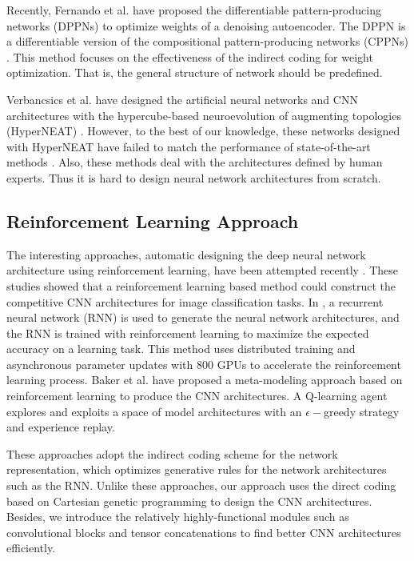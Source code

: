 Recently, Fernando et al. \cite{fernando_convolution_2016} have proposed the differentiable pattern-producing networks (DPPNs) to optimize weights of a denoising autoencoder. The DPPN is a differentiable version of the compositional pattern-producing networks (CPPNs) \cite{stanley_compositional_2007}. This method focuses on the effectiveness of the indirect coding for weight optimization. That is, the general structure of network should be predefined.

Verbancsics et al. \cite{verbancsics_generative_2013,verbancsics_image_2015} have designed the artificial neural networks and CNN architectures with the hypercube-based neuroevolution of augmenting topologies (HyperNEAT) \cite{stanley_hypercube-based_2009}.
However, to the best of our knowledge, these networks designed with HyperNEAT have failed to match the performance of state-of-the-art methods .
Also, these methods deal with the architectures defined by human experts. Thus it is hard to design neural network architectures from scratch.

\subsection{Reinforcement Learning Approach}
The interesting approaches, automatic designing the deep neural network architecture using reinforcement learning, have been attempted recently \cite{zoph_neural_2016,baker_designing_2016}.
These studies showed that a reinforcement learning based method could construct the competitive CNN architectures for image classification tasks.
In \cite{zoph_neural_2016}, a recurrent neural network (RNN) is used to generate the neural network architectures, and the RNN is trained with reinforcement learning to maximize the expected accuracy on a learning task.
This method uses distributed training and asynchronous parameter updates with $800$ GPUs to accelerate the reinforcement learning process.
Baker et al. \cite{baker_designing_2016} have proposed a meta-modeling approach based on reinforcement learning to produce the CNN architectures.
A Q-learning agent explores and exploits a space of model architectures with an $\epsilon -$greedy strategy and experience replay.

These approaches adopt the indirect coding scheme for the network representation, which optimizes generative rules for the network architectures such as the RNN.
Unlike these approaches, our approach uses the direct coding based on Cartesian genetic programming to design the CNN architectures.
Besides, we introduce the relatively highly-functional modules such as convolutional blocks and tensor concatenations to find better CNN architectures efficiently.


